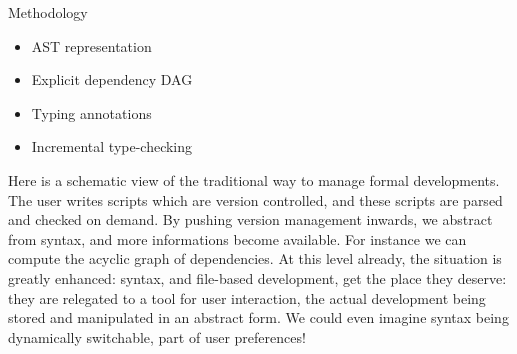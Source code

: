 \documentclass[ignorenonframetext,red]{beamer}
\begin{document}
\begin{frame}{Methodology}
  \begin{center}
  \end{center}
  \begin{itemize}
  \item<4-> AST representation
  \item<5-> Explicit dependency DAG
  \item<7-> Typing annotations
  \item<8-> Incremental type-checking
  \end{itemize}
\end{frame}

Here is a schematic view of the traditional way to manage formal
developments. The user writes scripts which are version controlled,
and these scripts are parsed and checked on demand. By pushing version
management inwards, we abstract from syntax, and more informations
become available. For instance we can compute the acyclic graph of
dependencies. At this level already, the situation is greatly
enhanced: syntax, and file-based development, get the place they
deserve: they are relegated to a tool for user interaction, the actual
development being stored and manipulated in an abstract form. We could
even imagine syntax being dynamically switchable, part of user
preferences!
\end{document}

